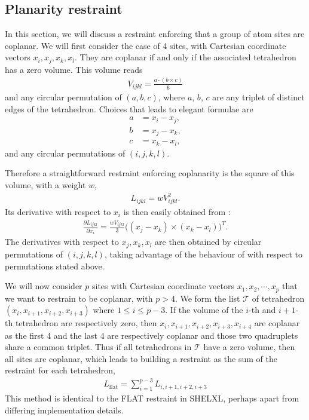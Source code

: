\documentclass[11pt]{article}
\DeclareMathOperator{\dotprod}{\cdot}
\DeclareMathOperator{\crossprod}{\times}
\newcommand{\partialder}[2]{\frac{\partial #1}{\partial #2}}
\begin{document}
\subsection{Planarity restraint}

In this section, we will discuss a restraint enforcing that a group of atom sites are coplanar. We will first consider the case of 4 sites, with Cartesian coordinate vectors $x_i, x_j, x_k, x_l$. They are coplanar if and only if the associated tetrahedron has a zero volume. This volume reads
\begin{align}
V_{ijkl} = \frac{a \dotprod (b \crossprod c)}{6}
\label{eqn:tetrahedron:volume}
\end{align}
and any circular permutation of $(a, b, c)$, where $a$, $b$, $c$ are any triplet of distinct edges of the tetrahedron. Choices that leads to elegant formulae are
\begin{align}
a &= x_i - x_j,\nonumber\\ 
b &= x_j - x_k,\label{eqn:tetrahedron:edges:choice1}\\ 
c &= x_k - x_l,\nonumber
\end{align}
and any circular permutations of $(i,j,k,l)$. 

Therefore a straightforward restraint enforcing coplanarity is the square of this volume, with a weight $w$,
\begin{align}
L_{ijkl} = w V_{ijkl}^2.
\end{align}
Its derivative with respect to $x_i$ is then easily obtained from :
\begin{align}
\partialder{L_{ijkl}}{x_i} = \frac{wV_{ijkl}}{3}\big((x_j - x_k) \crossprod (x_k - x_l)\big)^T.
\end{align}
The derivatives with respect to $x_j, x_k, x_l$ are then obtained by circular permutations of $(i,j,k,l)$, taking advantage of the behaviour of  with respect to permutations stated above.

We will now consider $p$ sites with Cartesian coordinate vectors $x_1, x_2, \cdots, x_p$ that we want to restrain to be coplanar, with $p>4$. We form the list $\mathcal{T}$ of tetrahedron $(x_i, x_{i+1}, x_{i+2}, x_{i+3})$ where $1 \le i \le p-3$. If the volume of the $i$-th and $i+1$-th tetrahedron are respectively zero, then $x_i, x_{i+1}, x_{i+2}, x_{i+3}, x_{i+4}$ are coplanar as the first 4 and the last 4 are respectively coplanar and those two quadruplets share a common triplet. Thus if all tetrahedrons in $\mathcal{T}$ have a zero volume, then all sites are coplanar, which leads to building a restraint as the sum of the restraint for each tetrahedron,
\begin{align}
L_\text{flat} = \sum_{i=1}^{p-3} L_{i,i+1,i+2,i+3}
\label{eqn:restraint:flatness:many}
\end{align}
This method is identical to the FLAT restraint in SHELXL, perhaps apart from differing implementation details. 
\end{document}
